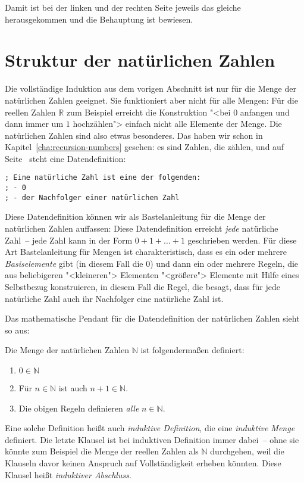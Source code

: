 Damit ist bei der linken und der rechten Seite jeweils das gleiche
herausgekommen und die Behauptung ist bewiesen.

\section{Struktur der natürlichen Zahlen}

Die vollständige Induktion aus dem vorigen Abschnitt ist nur für die
Menge der natürlichen Zahlen geeignet.  Sie funktioniert aber nicht für alle
Mengen: Für die reellen Zahlen $\mathbb{R}$ zum Beispiel erreicht die
Konstruktion "<bei $0$ anfangen und dann immer um $1$ hochzählen"> einfach
nicht alle Elemente der Menge.%
Die
natürlichen Zahlen sind also etwas besonderes.  Das haben wir schon in
Kapitel~\ref{cha:recursion-numbers} gesehen: es sind Zahlen, die zählen,
und auf Seite~\pageref{page:datendefinition-N} steht eine
Datendefinition:
%
\begin{lstlisting}
; Eine natürliche Zahl ist eine der folgenden:
; - 0
; - der Nachfolger einer natürlichen Zahl
\end{lstlisting}
%
Diese Datendefinition können wir als Bastelanleitung für die Menge der
natürlichen Zahlen auffassen:
Diese Datendefinition erreicht \emph{jede} natürliche Zahl~-- jede Zahl kann
in der Form $0+1+\ldots+1$ geschrieben werden.  Für diese Art
Bastelanleitung für Mengen ist charakteristisch, dass es ein oder
mehrere \textit{Basiselemente} gibt (in diesem
Fall die $0$) und dann ein oder mehrere Regeln, die aus beliebigeren
"<kleineren"> Elementen "<größere"> Elemente mit Hilfe eines Selbstbezug konstruieren, in diesem
Fall die Regel, die besagt, dass für jede natürliche Zahl auch ihr
Nachfolger eine natürliche Zahl ist.

Das mathematische Pendant für die Datendefinition der natürlichen
Zahlen sieht so aus:
%
\begin{definition}
  \label{def:N}
  Die Menge der natürlichen Zahlen $\mathbb{N}$ ist folgendermaßen definiert:
  \begin{enumerate}
  \item $0\in\mathbb{N}$
  \item Für $n\in\mathbb{N}$ ist auch $n+1\in\mathbb{N}$.
  \item Die obigen Regeln definieren \emph{alle} $n\in\mathbb{N}$.
  \end{enumerate}
\end{definition}
% 
Eine solche Definition heißt auch \textit{induktive
  Definition}, die eine \textit{induktive
  Menge} definiert.  Die letzte Klausel ist bei
induktiven Definition immer dabei~--
ohne sie könnte zum Beispiel die Menge der reellen
Zahlen als $\mathbb{N}$ durchgehen, weil die Klauseln davor 
keinen Anspruch auf Vollständigkeit erheben könnten.  Diese Klausel
heißt \textit{induktiver Abschluss}.


